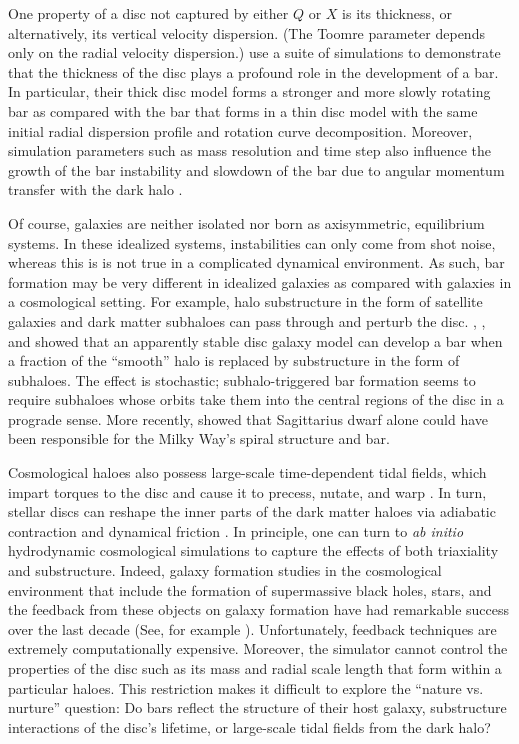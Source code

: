One property of a disc not captured by either $Q$ or $X$ is its
thickness, or alternatively, its vertical velocity dispersion.  (The
Toomre parameter depends only on the radial velocity dispersion.)
\citet{Klypin2009} use a suite of simulations to demonstrate that the
thickness of the disc plays a profound role in the development of a
bar.  In particular, their thick disc model forms a stronger and more
slowly rotating bar as compared with the bar that forms in a thin disc
model with the same initial radial dispersion profile and rotation
curve decomposition.  Moreover, simulation parameters such as mass
resolution and time step also influence the growth of the bar
instability and slowdown of the bar due to angular momentum transfer
with the dark halo \citep{dbs2009}.

Of course, galaxies are neither isolated nor born as axisymmetric,
equilibrium systems. In these idealized systems, instabilities can only come from shot noise, whereas this is is not true in a complicated dynamical environment. As such, bar formation may be very different in idealized
galaxies as compared with galaxies in a cosmological setting.  For
example, halo substructure in the form of satellite galaxies and dark
matter subhaloes can pass through and perturb the disc.
\citet{gauthier2006}, \citet{kazantzidis2008}, and
\citet{dbs2009} showed that an apparently stable disc galaxy
model can develop a bar when a fraction of the ``smooth'' halo is
replaced by substructure in the form of subhaloes.  The effect is
stochastic; subhalo-triggered bar formation seems to require subhaloes
whose orbits take them into the central regions of the disc in a
prograde sense.  More recently, \citet{purcell2011} showed that
Sagittarius dwarf alone could have been responsible for the Milky
Way's spiral structure and bar.

Cosmological haloes also possess large-scale time-dependent tidal
fields, which impart torques to the disc and cause it to precess,
nutate, and warp
\citep{dubinski1995,binney1998,dubinski2009,Bauer2018a}.  In turn,
stellar discs can reshape the inner parts of the dark matter haloes
via adiabatic contraction and dynamical friction
\citep{blumenthal1986, ryden1987, dubinski1994,
  DubinskiKuijkenRigidDisks,
  DeBuhrStellarDisks,YurinSpringelStellarDisks, Bauer2018a}.  In
principle, one can turn to {\it ab initio} hydrodynamic cosmological
simulations to capture the effects of both triaxiality and
substructure.  Indeed, galaxy formation studies in the cosmological
environment that include the formation of supermassive black holes,
stars, and the feedback from these objects on galaxy formation have
had remarkable success over the last decade (See, for
  example \citet{IllustrisFeedback, Eagle}).  Unfortunately, feedback
techniques are extremely computationally expensive.  Moreover, the
simulator cannot control the properties of the disc such as its mass
and radial scale length that form within a particular haloes.  This
restriction makes it difficult to explore the ``nature vs. nurture''
question: Do bars reflect the structure of their host galaxy,
substructure interactions of the disc's lifetime, or large-scale tidal
fields from the dark halo?

